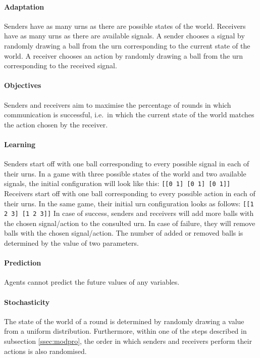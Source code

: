 \documentclass[
	DIV=calc,
	BCOR=0mm,
	pagesize,
]{scrartcl}
\newcommand{\code}[1]{\texttt{#1}}
\begin{document}
\paragraph{Adaptation}
Senders have as many urns as there are possible states of the world.
Receivers have as many urns as there are available signals.
A sender chooses a signal by randomly drawing a ball from the urn corresponding to the current state of the world.
A receiver chooses an action by randomly drawing a ball from the urn corresponding to the received signal.

\paragraph{Objectives}
Senders and receivers aim to maximise the percentage of rounds in which communication is successful, i.e.~in which the current state of the world matches the action chosen by the receiver.

\paragraph{Learning}
Senders start off with one ball corresponding to every possible signal in each of their urns.
In a game with three possible states of the world and two available signals, the initial configuration will look like this: \code{[[0 1] [0 1] [0 1]]}
Receivers start off with one ball corresponding to every possible action in each of their urns.
In the same game, their initial urn configuration looks as follows: \code{[[1 2 3] [1 2 3]]}
In case of success, senders and receivers will add more balls with the chosen signal/action to the consulted urn.
In case of failure, they will remove balls with the chosen signal/action.
The number of added or removed balls is determined by the value of two parameters.

\paragraph{Prediction}
Agents cannot predict the future values of any variables.

\paragraph{Stochasticity}
The state of the world of a round is determined by randomly drawing a value from a uniform distribution.
Furthermore, within one of the steps described in subsection \ref{ssec:modpro}, the order in which senders and receivers perform their actions is also randomised.
\end{document}
